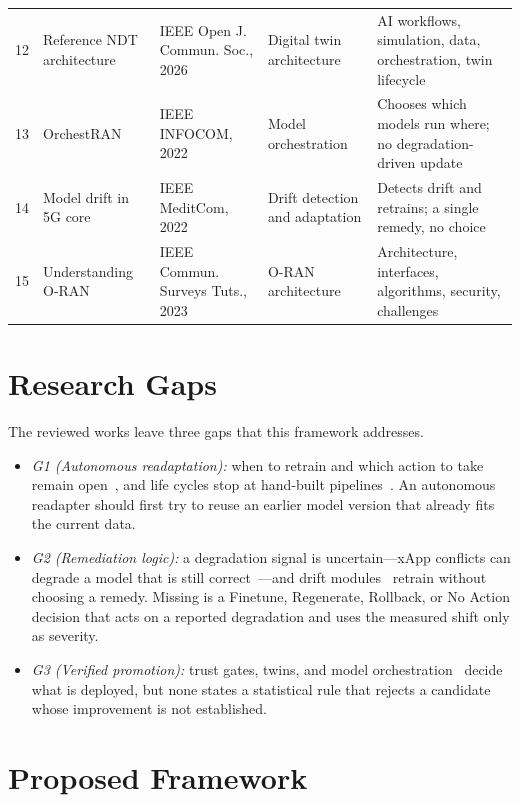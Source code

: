 \documentclass[conference]{IEEEtran}
\begin{document}
\begin{table}[t]
\begin{tabular}{@{}r L{3.5cm} L{3.7cm} L{2.9cm} L{6.6cm}@{}}
12 & Reference NDT architecture~\cite{zakihindi2026reference} & IEEE Open J. Commun. Soc., 2026 & Digital twin architecture & AI workflows, simulation, data, orchestration, twin lifecycle\\
13 & OrchestRAN~\cite{doro2022orchestran} & IEEE INFOCOM, 2022 & Model orchestration & Chooses which models run where; no degradation-driven update\\
14 & Model drift in 5G core~\cite{manias2022model} & IEEE MeditCom, 2022 & Drift detection and adaptation & Detects drift and retrains; a single remedy, no choice\\
15 & Understanding O-RAN~\cite{polese2023understanding} & IEEE Commun. Surveys Tuts., 2023 & O-RAN architecture & Architecture, interfaces, algorithms, security, challenges\\
\bottomrule
\end{tabular}
\end{table}

\section{Research Gaps}
The reviewed works leave three gaps that this framework addresses.
\begin{itemize}
\item \emph{G1 (Autonomous readaptation):} when to retrain and which action to take remain
open~\cite{mekrache2024intent,bonati2021intelligence,polese2023coloran}, and life cycles stop at
hand-built pipelines~\cite{li2022rlops,parraullauri2025reason}. An autonomous readapter should
first try to reuse an earlier model version that already fits the current data.
\item \emph{G2 (Remediation logic):} a degradation signal is uncertain---xApp conflicts can
degrade a model that is still correct~\cite{adamczyk2023conflict}---and drift
modules~\cite{manias2022model} retrain without choosing a remedy. Missing is a Finetune,
Regenerate, Rollback, or No Action decision that acts on a reported degradation and uses the
measured shift only as severity.
\item \emph{G3 (Verified promotion):} trust gates, twins, and model
orchestration~\cite{parraullauri2025reason,zakihindi2026reference,doro2022orchestran} decide
what is deployed, but none states a statistical rule that rejects a candidate whose improvement
is not established.
\end{itemize}

\section{Proposed Framework}
\end{document}
